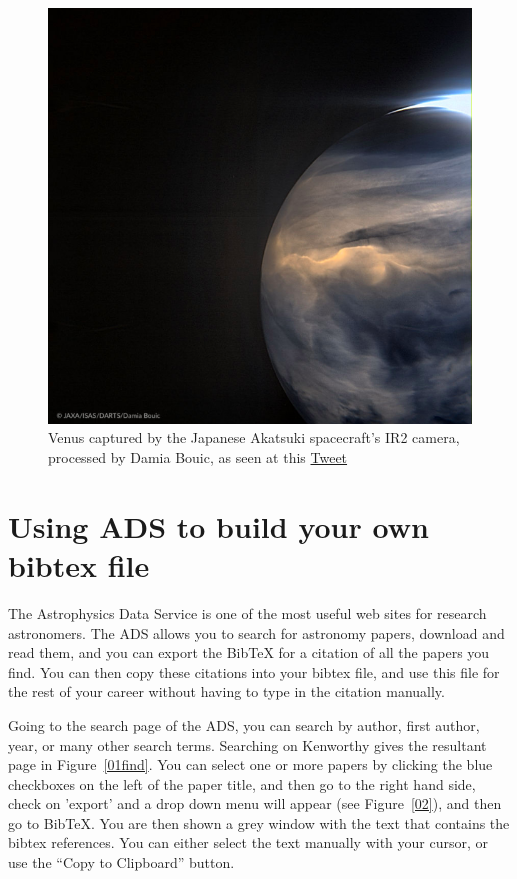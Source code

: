 \documentclass[a4,modern]{aastex63}
\begin{document}
\begin{figure}[htp]
\centering
\includegraphics[angle=0,width=1.0\textwidth]{venus_ir}
\caption{Venus captured by the Japanese Akatsuki spacecraft's IR2 camera, processed by Damia Bouic, as seen at this \href{https://twitter.com/CosmicRami/status/1253293199897944066}{Tweet}}
\end{figure}


\section{Using ADS to build your own bibtex file}

The Astrophysics Data Service is one of the most useful web sites for research astronomers.
%
The ADS allows you to search for astronomy papers, download and read them, and you can export the BibTeX for a citation of all the papers you find.
%
You can then copy these citations into your bibtex file, and use this file for the rest of your career without having to type in the citation manually.

Going to the search page of the ADS, you can search by author, first author, year, or many other search terms. Searching on Kenworthy gives the resultant page in Figure~\ref{01find}.
%
You can select one or more papers by clicking the blue checkboxes on the left of the paper title, and then go to the right hand side, check on 'export' and a drop down menu will appear (see Figure~\ref{02}), and then go to BibTeX.
%
You are then shown a grey window with the text that contains the bibtex references. You can either select the text manually with your cursor, or use the ``Copy to Clipboard'' button.
\end{document}
